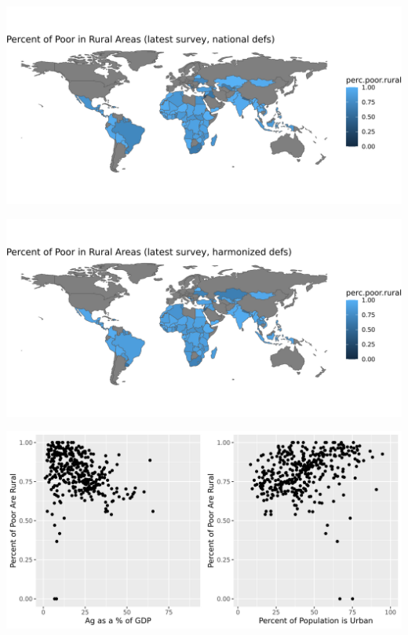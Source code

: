 \documentclass[aspectratio=169]{beamer}
\begin{document}
\begin{frame}
\includegraphics[width=\textwidth]{../res/perc.poor.rural_nat.png}
\end{frame}

\begin{frame}
\includegraphics[width=\textwidth]{../res/perc.poor.rural_int.png}
\end{frame}

\begin{frame}
\includegraphics[width=\textwidth]{../res/Compare_other_vars.png}
\end{frame}
\end{document}
